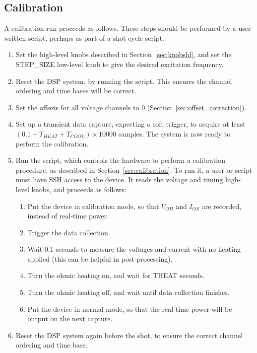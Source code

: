 \documentclass[12pt,a4paper]{article}
\begin{document}
\subsection{Calibration}
\label{sec:run_calibration}
A calibration run proceeds as follows. These steps should be performed by a user-written script, perhaps as part of a shot cycle script.
\begin{enumerate}
\item{Set the high-level knobs described in Section~\ref{sec:knobshl}, and set the STEP{\_}SIZE low-level knob to give the desired excitation
    frequency.}
\item{Reset the DSP system, by running the \mbox{} script. This ensures the channel ordering and time bases will be
    correct.}
\item{Set the offsets for all voltage channels to 0 (Section~\ref{sec:offset_correction})}.
\item{Set up a transient data capture, expecting a soft trigger, to acquire at least $(0.1 + T_{HEAT} + T_{COOL})\times 10000$ samples. The system is now
    ready to perform the calibration.}
\item{Run the  script, which controls the hardware to perform a calibration procedure, as described in
    Section~\ref{sec:calibration}. To run it, a user or script must have SSH access to the device. It reads the voltage and timing high-level knobs, and
    proceeds as follows:
\begin{enumerate}
\item{Put the device in calibration mode, so that $V_{OH}$ and $I_{OS}$ are recorded, instead of real-time power.}
\item{Trigger the data collection.}
\item{Wait 0.1 seconds to measure the voltages and current with no heating applied (this can be helpful in post-processing).}
\item{Turn the ohmic heating on, and wait for THEAT seconds}.
\item{Turn the ohmic heating off, and wait until data collection finishes.}
\item{Put the device in normal mode, so that the real-time power will be output on the next capture.}
\end{enumerate}
}
\item{Reset the DSP system again before the shot, to ensure the correct channel ordering and time base.}
\end{enumerate}
\end{document}
